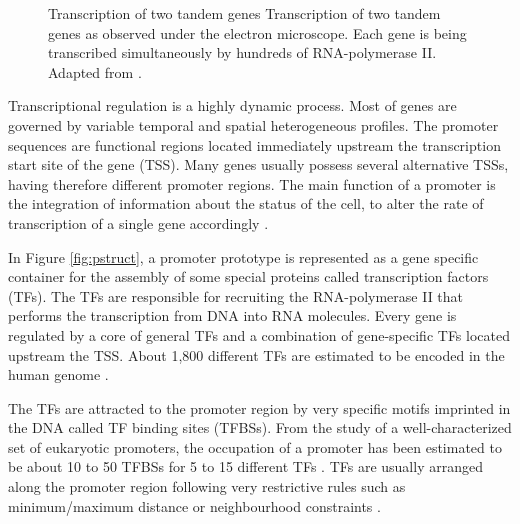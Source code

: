 \begin{figure}[t!]
\begin{center}
\setlength{\fboxsep}{0pt}
          {Transcription of two tandem genes}%
          {Transcription of two tandem genes as observed under the electron microscope.}%
          {Each gene is being transcribed simultaneously by hundreds of RNA-polymerase II. Adapted from \citet{alberts:1994a}.}
\end{center}
\end{figure}


Transcriptional regulation  
is a highly dynamic process. Most of genes are governed by variable 
temporal and spatial heterogeneous profiles. The promoter sequences  
 are functional regions located immediately upstream the transcription start site of the gene (TSS). 
Many genes usually possess several alternative TSSs, having therefore different promoter regions.
The main function of a promoter is the integration of information about the status of the cell, 
to alter the rate of transcription of a single gene accordingly \citep{wray:2003a}. 

In Figure \ref{fig:pstruct}, a promoter prototype is represented as a gene specific container for 
the assembly of some special proteins called transcription factors (TFs). 
The TFs are responsible for 
recruiting the RNA-polymerase II that performs the transcription from DNA into RNA molecules. 
Every gene is regulated by a core of general TFs and a combination of gene-specific TFs located 
upstream the TSS.  About 1,800 different TFs are estimated to be encoded in the human genome 
\citep{venter:2001a}. 

The TFs are attracted to the promoter region by very specific motifs imprinted in the DNA called 
TF binding sites (TFBSs).  
From the study of a well-characterized set of eukaryotic promoters, the 
occupation of a promoter has been estimated to be about 10 to 50 TFBSs for 5 to 15 different TFs 
\citep{wray:2003a}. TFs are usually arranged along the promoter region following very restrictive rules 
such as minimum/maximum distance or neighbourhood constraints \citep{pedersen:1999a,werner:2000a}.

